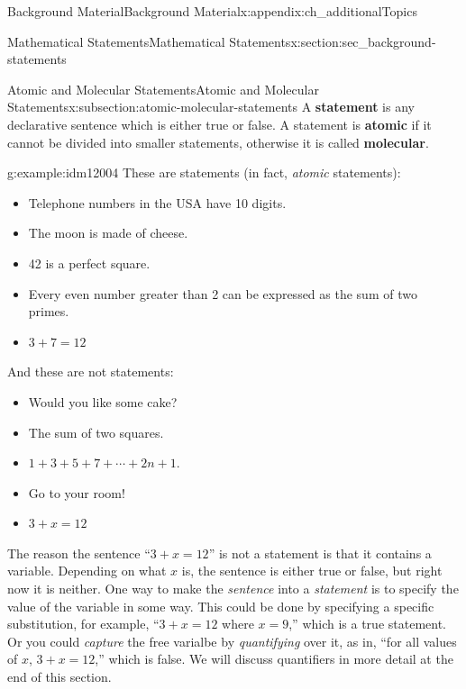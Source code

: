 \documentclass[oneside,10pt,]{book}
\newcommand{\terminology}[1]{\textbf{#1}}
\numberwithin{equation}{chapter}
\begin{document}
\begin{appendixptx}{Background Material}{}{Background Material}{}{}{x:appendix:ch_additionalTopics}
\begin{sectionptx}{Mathematical Statements}{}{Mathematical Statements}{}{}{x:section:sec_background-statements}
\begin{introduction}{}
\end{introduction}%
%
%
\typeout{************************************************}
\typeout{************************************************}
%
\begin{subsectionptx}{Atomic and Molecular Statements}{}{Atomic and Molecular Statements}{}{}{x:subsection:atomic-molecular-statements}
A \terminology{statement} is any declarative sentence which is either true or false. A statement is \terminology{atomic} if it cannot be divided into smaller statements, otherwise it is called \terminology{molecular}.%
\begin{example}{}{g:example:idm12004}%
These are statements (in fact, \emph{atomic} statements):%
\begin{itemize}[label=\textbullet]
\item{}Telephone numbers in the USA have 10 digits.%
\item{}The moon is made of cheese.%
\item{}42 is a perfect square.%
\item{}Every even number greater than 2 can be expressed as the sum of two primes.%
\item{}\(3+7 = 12\)%
\end{itemize}
And these are not statements:%
\begin{itemize}[label=\textbullet]
\item{}Would you like some cake?%
\item{}The sum of two squares.%
\item{}\(1+3+5+7+\cdots+2n+1\).%
\item{}Go to your room!%
\item{}\(3+x = 12\)%
\end{itemize}
%
\end{example}
The reason the sentence ``\(3 + x = 12\)'' is not a statement is that it contains a variable. Depending on what \(x\) is, the sentence is either true or false, but right now it is neither. One way to make the \emph{sentence} into a \emph{statement} is to specify the value of the variable in some way. This could be done by specifying a specific substitution, for example, ``\(3+x = 12\) where \(x = 9\),'' which is a true statement.  Or you could \emph{capture} the free varialbe by \emph{quantifying} over it, as in, ``for all values of \(x\), \(3+x = 12\),'' which is false. We will discuss quantifiers in more detail at the end of this section.%
\par

\end{subsectionptx}
\end{sectionptx}
\end{appendixptx}
\end{document}
